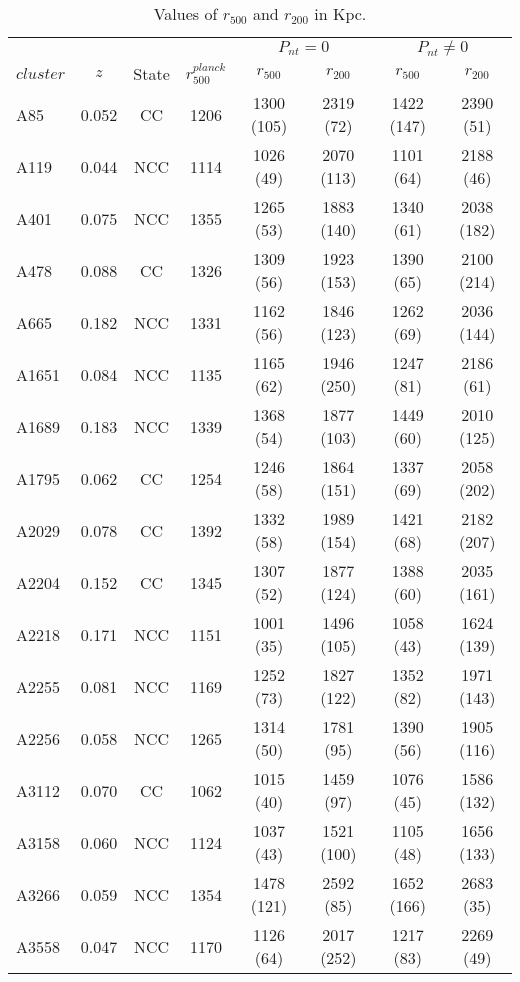 \documentclass[a4paper,fleqn,usenatbib]{mnras}
\begin{document}
 
  \begin{table*}
 \caption{Values of $r_{500}$ and $r_{200}$ in Kpc.}
 \label{fit}
 \begin{tabular}{|l|ccccccc}
  \hline
    \cline{5-8}
&&&&\multicolumn{2}{c}{$P_{nt}=0$}&\multicolumn{2}{c}{$P_{nt}\neq0$}\\
\cline{5-8}
$cluster$&$z$   &State & $r_{500}^{planck}$& $r_{500}$   &$r_{200}$& $r_{500}$&$r_{200}$\\
  \hline 
A85  &    0.052 &CC  &  1206     &  1300 (105)  &   2319 (72)    & 1422 (147)   &2390  (51)    \\
A119 &    0.044 &NCC &  1114     &  1026 (49)   &   2070 (113)   & 1101  (64)   &2188  (46)    \\
A401 &    0.075 &NCC &  1355     &  1265 (53)   &   1883 (140)   & 1340  (61)   &2038  (182)    \\
A478 &    0.088 &CC  &  1326     &  1309 (56)   &   1923 (153)   & 1390  (65)   &2100  (214)     \\
A665 &    0.182 &NCC &  1331     &  1162 (56)   &   1846 (123)   & 1262  (69)   &2036  (144)     \\
A1651&    0.084 &NCC &  1135     &  1165 (62)   &   1946 (250)   & 1247  (81)   &2186  (61)     \\
A1689&    0.183 &NCC &  1339     &  1368 (54)   &   1877 (103)   & 1449  (60)   &2010  (125)     \\
A1795&    0.062 &CC  &  1254     &  1246 (58)   &   1864 (151)   & 1337  (69)   &2058  (202)      \\
A2029&    0.078 &CC  &  1392     &  1332 (58)   &   1989 (154)   & 1421  (68)   &2182  (207)      \\
A2204&    0.152 &CC  &  1345     &  1307 (52)   &   1877 (124)   & 1388  (60)   &2035  (161)      \\
A2218&    0.171 &NCC &  1151     &  1001 (35)   &   1496 (105)   & 1058  (43)   &1624  (139)      \\
A2255&    0.081 &NCC &  1169     &  1252 (73)   &   1827 (122)   & 1352  (82)   &1971  (143)      \\
A2256&    0.058 &NCC &  1265     &  1314 (50)   &   1781 (95)    & 1390  (56)   &1905  (116)       \\
A3112&    0.070 &CC  &  1062     &  1015 (40)   &   1459 (97)    & 1076  (45)   &1586  (132)       \\
A3158&    0.060 &NCC &  1124     &  1037 (43)   &   1521 (100)   & 1105  (48)   &1656  (133)       \\
A3266&    0.059 &NCC &  1354     &  1478 (121)  &   2592 (85)    & 1652  (166)  &2683  (35)       \\
A3558&    0.047 &NCC &  1170     &  1126 (64)   &   2017 (252)   & 1217  (83)   &2269  (49)       \\
  \hline
 \end{tabular}
 

\end{table*}
\end{document}
